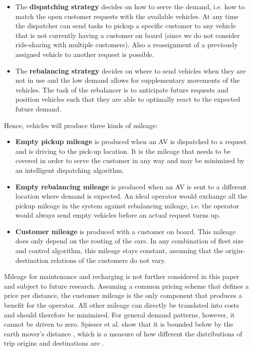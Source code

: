 \begin{itemize}
\item The \textbf{dispatching strategy} decides on how to serve the demand, i.e.
how to match the open customer requests with the available vehicles. At any time the dispatcher can send tasks to pickup a specific customer to any vehicle that is not currently having a customer on board (since we do not consider ride-sharing with multiple customers). Also a reassignment of a previously assigned
vehicle to another request is possible.
\item The \textbf{rebalancing strategy} decides on where to send vehicles when they
are not in use and the low demand allows for supplementary movements of the vehicles.
The task of the rebalancer is to anticipate future requests and position vehicles
such that they are able to optimally react to the expected future demand.
\end{itemize}

Hence, vehicles will produce three kinds of mileage:

\begin{itemize}
\item \textbf{Empty pickup mileage} is produced when an AV is dispatched
to a request and is driving to the pick-up location. It is the mileage that needs
to be covered in order to serve the customer in any way and may be minimized
by an intelligent dispatching algorithm.
\item \textbf{Empty rebalancing mileage} is produced when an AV is sent
to a different location where demand is expected. An ideal operator would
exchange all the pickup mileage in the system against rebalancing mileage, i.e. the operator would always send empty vehicles before an actual request turns up.
\item \textbf{Customer mileage} is produced with a customer on board. This mileage does only depend on the routing of the cars. In any combination of fleet size and
control algorithm, this mileage stays constant, assuming that the origin-destination relations of the customers do not vary.
\end{itemize}

Mileage for maintenance and recharging is not further considered in this paper and subject to future research. 
Assuming a common pricing scheme that defines a price per distance, the customer mileage
is the only component that produces a benefit for the operator. All other mileage
can directly be translated into costs and should therefore be minimized. For general
demand patterns, however, it cannot be driven to zero. Spieser et al. \cite{spieser2014toward}
show that it is bounded below by the earth mover's distance \cite{levina2001earth}, which is a measure
of how different the distributions of trip origins and destinations are \cite{ruschendorf1985wasserstein}.

